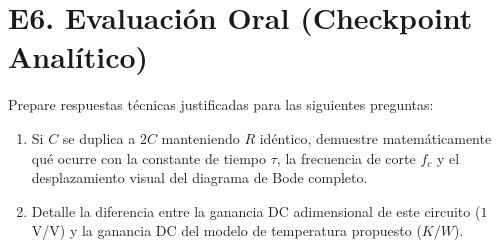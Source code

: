 \documentclass[11pt, a4paper]{article}
\begin{document}
\section*{E6. Evaluación Oral (Checkpoint Analítico)}
Prepare respuestas técnicas justificadas para las siguientes preguntas:
\begin{enumerate}
    \item Si $C$ se duplica a $2C$ manteniendo $R$ idéntico, demuestre matemáticamente qué ocurre con la constante de tiempo $\tau$, la frecuencia de corte $f_c$ y el desplazamiento visual del diagrama de Bode completo.
    \item Detalle la diferencia entre la ganancia DC adimensional de este circuito ($1$ V/V) y la ganancia DC del modelo de temperatura propuesto ($K/W$).
\end{enumerate}
\end{document}
